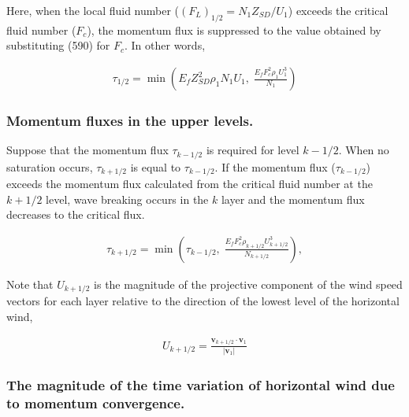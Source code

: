 Here, when the local fluid number (\((F_L)_{1/2} = N_1 Z_{SD}/U_1\))
exceeds the critical fluid number (\(F_c\)), the momentum flux is
suppressed to the value obtained by substituting (590) for \(F_c\). In
other words,

\begin{eqnarray}
  \tau_{1/2} = \min \left(
                   E_f Z_{SD}^{2} \rho_1 N_1 U_1, \;
                  \frac{E_f F_c^{2} \rho_1 U_1^3}{N_1}
               \right)
\end{eqnarray}

\hypertarget{momentum-fluxes-in-the-upper-levels.}{%
\subsubsection{Momentum fluxes in the upper
levels.}\label{momentum-fluxes-in-the-upper-levels.}}

Suppose that the momentum flux \(\tau_{k-1/2}\) is required for level
\(k-1/2\). When no saturation occurs, \(\tau_{k+1/2}\) is equal to
\(\tau_{k-1/2}\). If the momentum flux (\(\tau_{k-1/2}\)) exceeds the
momentum flux calculated from the critical fluid number at the \(k+1/2\)
level, wave breaking occurs in the \(k\) layer and the momentum flux
decreases to the critical flux.

\begin{eqnarray}
  \tau_{k+1/2} = \min \left(
               \tau_{k-1/2}, \;
               \frac{E_f F_c^2 \rho_{k+1/2} U_{k+1/2}^3}{N_{k+1/2}}
                      \right),
\end{eqnarray}

Note that \(U_{k+1/2}\) is the magnitude of the projective component of
the wind speed vectors for each layer relative to the direction of the
lowest level of the horizontal wind,

\begin{eqnarray}
  U_{k+1/2} = \frac{{\mathbf v}_{k+1/2}
                      \cdot {\mathbf v}_{1}}
                   {|{\mathbf v}_{1}|       }
\end{eqnarray}

\hypertarget{the-magnitude-of-the-time-variation-of-horizontal-wind-due-to-momentum-convergence.}{%
\subsubsection{The magnitude of the time variation of horizontal wind
due to momentum
convergence.}\label{the-magnitude-of-the-time-variation-of-horizontal-wind-due-to-momentum-convergence.}}

